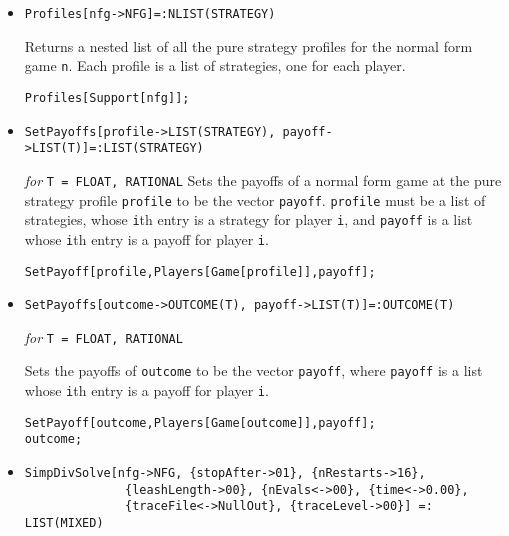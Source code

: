 \begin{itemize}
\item{}
\protect \large \begin{verbatim}
Profiles[nfg->NFG]=:NLIST(STRATEGY)
\end{verbatim}\normalsize

\bd 
Returns a nested list of all the pure strategy profiles for the normal
form game \verb+n+.  Each profile is a list of strategies, one for
each player.
\begin{verbatim}
Profiles[Support[nfg]];
\end{verbatim} 
\ed


\item{}
\protect \large \begin{verbatim}
SetPayoffs[profile->LIST(STRATEGY), payoff->LIST(T)]=:LIST(STRATEGY)
\end{verbatim}\normalsize
 
{\it for} {\tt T = FLOAT, RATIONAL} 
\bd 
Sets the payoffs of a normal form game at the pure strategy profile
\verb+profile+ to be the vector \verb+payoff+.  \verb+profile+ must be
a list of strategies, whose \verb+i+th entry is a strategy for player
\verb+i+, and \verb+payoff+ is a list whose \verb+i+th
entry is a payoff for player \verb+i+.
\begin{verbatim}
SetPayoff[profile,Players[Game[profile]],payoff];
\end{verbatim} 
\ed

\item{}
\protect \large \begin{verbatim}
SetPayoffs[outcome->OUTCOME(T), payoff->LIST(T)]=:OUTCOME(T)
\end{verbatim}\normalsize
 
{\it for} {\tt T = FLOAT, RATIONAL}
\bd 

Sets the payoffs of \verb+outcome+ to be the vector \verb+payoff+,
where \verb+payoff+ is a list whose \verb+i+th entry is a payoff for
player \verb+i+.
\begin{verbatim}
SetPayoff[outcome,Players[Game[outcome]],payoff];
outcome;
\end{verbatim} 
\ed

\item{}
\protect \large \begin{verbatim}
SimpDivSolve[nfg->NFG, {stopAfter->01}, {nRestarts->16}, 
              {leashLength->00}, {nEvals<->00}, {time<->0.00}, 
              {traceFile<->NullOut}, {traceLevel->00}] =: LIST(MIXED)
\end{verbatim}\normalsize


\end{itemize}
